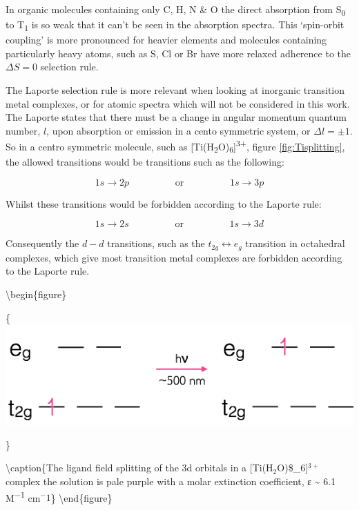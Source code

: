 \documentclass[
]{book}
\begin{document}
In organic molecules containing only C, H, N \& O the direct absorption from S\textsubscript{0} to T\textsubscript{1} is so weak that it can't be seen in the absorption spectra. This `spin-orbit coupling' is more pronounced for heavier elements and molecules containing particularly heavy atoms, such as S, Cl or Br have more relaxed adherence to the \(\Delta S = 0\) selection rule.

The Laporte selection rule is more relevant when looking at inorganic transition metal complexes, or for atomic spectra which will not be considered in this work. The Laporte states that there must be a change in angular momentum quantum number, \(l\), upon absorption or emission in a cento symmetric system, or \(\Delta l = \pm 1\). So in a centro symmetric molecule, such as {[}Ti(H\textsubscript{2}O)\textsubscript{6}{]}\textsuperscript{3+}, figure \ref{fig:Tisplitting}, the allowed transitions would be transitions such as the following:

\begin{equation*}
1s \longrightarrow 2p \hspace{2cm}\textrm{or} \hspace{2cm} 1s \longrightarrow 3p
\end{equation*}

Whilst these transitions would be forbidden according to the Laporte rule:

\begin{equation*}
1s \longrightarrow 2s \hspace{2cm}\textrm{or} \hspace{2cm} 1s \longrightarrow 3d
\end{equation*}

Consequently the \(d-d\) transitions, such as the \(t_{2g} \longleftrightarrow e_g\) transition in octahedral complexes, which give most transition metal complexes are forbidden according to the Laporte rule.

\textbackslash begin\{figure\}

\{\centering \includegraphics[width=0.6\linewidth]{images/Ti3splitting}

\}

\textbackslash caption\{The ligand field splitting of the 3d orbitals in a {[}Ti(H\(_2\)O)\$\_6{]}\(^{3+}\) complex the solution is pale purple with a molar extinction coefficient, ε \textasciitilde{} 6.1 M\textsuperscript{−1} cm\(^{−}1\)\}\label{fig:Tisplitting}
\textbackslash end\{figure\}
\end{document}
